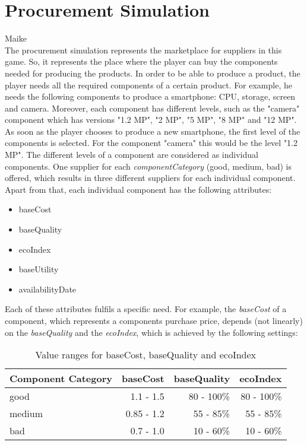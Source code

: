 \section{Procurement Simulation}
\label{procuresim}
Maike\\
The procurement simulation represents the marketplace for suppliers in this game. So, it represents the place where the player can buy the components needed for producing the products. In order to be able to produce a product, the player needs all the required components of a certain product. For example, he needs the following components to produce a smartphone: CPU, storage, screen and camera. Moreover, each component has different levels, such as the "camera" component which has versions "1.2 MP", "2 MP", "5 MP", "8 MP" and "12 MP".  As soon as the player chooses to produce a new smartphone, the first level of the components is selected. For the component "camera" this would be the level "1.2 MP". The different levels of a component are considered as individual components. One supplier for each \textit{componentCategory} (good, medium, bad) is offered, which results in three different suppliers for each individual component. Apart from that, each individual component has the following attributes:
\begin{itemize}
    \item baseCost
    \item baseQuality
    \item ecoIndex
    \item baseUtility
    \item availabilityDate
\end{itemize}
Each of these attributes fulfils a specific need. For example, the \textit{baseCost} of a component, which represents a components purchase price, depends (not linearly) on the \textit{baseQuality} and the \textit{ecoIndex}, which is achieved by the following settings:
    \begin{table}[ht]
    \centering
    \begin{tabular}{|l|r|r|r|}
    \hline
    Component Category & baseCost & baseQuality & ecoIndex \\
    \hline
    good & 1.1 - 1.5 & 80 - 100\% & 80 - 100\% \\
    medium & 0.85 - 1.2 & 55 - 85\% & 55 - 85\%\\
    bad  & 0.7 - 1.0 & 10 - 60\% & 10 - 60\%\\
    \hline
    \end{tabular}
    \caption{Value ranges for baseCost, baseQuality and ecoIndex}
    \label{component_price_calculation}
    \end{table}
